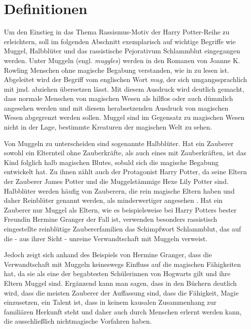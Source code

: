 \section{Definitionen}
Um den Einstieg in das Thema \glqq Rassismus-Motiv der  \glq Harry Potter\grq-Reihe\grqq{} zu erleichtern, soll im folgenden Abschnitt exemplarisch auf wichtige Begriffe wie \glqq Muggel\grqq, \glqq Halbblüter\grqq{} und das rassistische Pejorativum \glqq Schlammblut\grqq{} eingegangen werden.
Unter \glqq Muggeln\grqq{} (engl. \emph{muggles}) werden in den Romanen von Joanne K. Rowling Menschen ohne magische Begabung verstanden, wie in \cite[S. \,61]{JKR97} zu lesen ist. 
Abgeleitet wird der Begriff vom englischen Wort \emph{mug}, der sich umgangssprachlich mit \glqq jmd. abziehen\grqq{} übersetzen lässt. 
Mit diesem Ausdruck wird deutlich gemacht, dass \glqq normale\grqq{} Menschen von magischen Wesen als hilflos oder auch dümmlich angesehen werden und mit diesem herabsetzenden Ausdruck von magischen Wesen abgegrenzt werden sollen.
Muggel sind im Gegensatz zu magischen Wesen nicht in der Lage, bestimmte Kreaturen der magischen Welt zu sehen.

Von Muggeln zu unterscheiden sind sogenannte \glqq Halbblüter\grqq. 
Hat ein Zauberer sowohl ein Elternteil ohne Zauberkräfte, als auch eines mit Zauberkräften, ist das Kind folglich halb magischen \glqq Blutes\grqq, sobald sich die magische Begabung entwickelt hat. 
Zu ihnen zählt auch der Protagonist Harry Potter, da seine Eltern der Zauberer James Potter und die Muggelstämmige Hexe Lily Potter sind.
Halbblüter werden häufig von Zauberern, die rein magische Eltern haben und daher \glqq Reinblüter\grqq{} genannt werden, als minderwertiger angesehen \cite[S.\,220]{JKR03}. 
Hat ein Zauberer nur Muggel als Eltern, wie es beispielsweise bei Harry Potters bester Freundin Hermine Granger der Fall ist, verwenden besonders rassistisch eingestellte reinblütige Zaubererfamilien das Schimpfwort \glqq Schlammblut\grqq, das auf die - aus ihrer Sicht -  \glqq unreine\grqq{} Verwandtschaft mit Muggeln verweist.

Jedoch zeigt sich anhand des Beispiels von Hermine Granger, dass die Verwandtschaft mit Muggeln keineswegs Einfluss auf die magischen Fähigkeiten hat, da sie als eine der begabtesten Schülerinnen von Hogwarts gilt und ihre Eltern Muggel sind.
Ergänzend kann man sagen, dass in den Büchern deutlich wird, dass die meisten Zauberer der Auffassung sind, dass die Fähigkeit, Magie einzusetzen, ein Talent ist, dass in keinem kausalen Zusammenhang zur familiären Herkunft steht und daher auch durch Menschen erlernt werden kann, die ausschließlich nichtmagische Vorfahren haben. 



